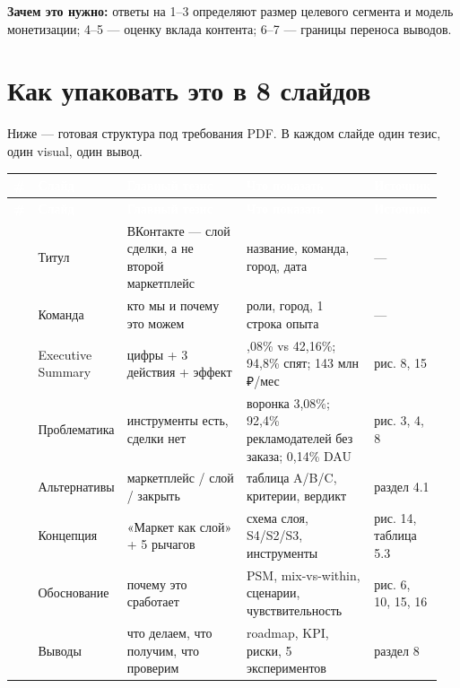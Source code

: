 \documentclass[10pt,a4paper]{article}
\begin{document}
\textbf{Зачем это нужно:} ответы на 1–3 определяют размер целевого сегмента и модель монетизации; 4–5 — оценку вклада контента; 6–7 — границы переноса выводов.\par

\clearpage

\section{Как упаковать это в 8 слайдов}

Ниже — готовая структура под требования PDF. В каждом слайде один тезис, один visual, один вывод.\par

\begingroup
\footnotesize
\setlength{\tabcolsep}{3pt}
\renewcommand{\arraystretch}{1.12}
\begin{longtable}{@{}>{\raggedright\arraybackslash}p{0.0286\linewidth}>{\raggedright\arraybackslash}p{0.1215\linewidth}>{\raggedright\arraybackslash}p{0.3288\linewidth}>{\raggedright\arraybackslash}p{0.3288\linewidth}>{\raggedright\arraybackslash}p{0.1430\linewidth}@{}}
\rowcolor{blue}
\textcolor{white}{\textbf{\#}} & \textcolor{white}{\textbf{Слайд}} & \textcolor{white}{\textbf{Главный тезис}} & \textcolor{white}{\textbf{Что показать}} & \textcolor{white}{\textbf{Источник}} \\
\endfirsthead
\rowcolor{blue}
\textcolor{white}{\textbf{\#}} & \textcolor{white}{\textbf{Слайд}} & \textcolor{white}{\textbf{Главный тезис}} & \textcolor{white}{\textbf{Что показать}} & \textcolor{white}{\textbf{Источник}} \\
\endhead
\hline
1 & Титул & ВКонтакте — слой сделки, а не второй маркетплейс & название, команда, город, дата & — \\
2 & Команда & кто мы и почему это можем & роли, город, 1 строка опыта & — \\
3 & Executive Summary & 3 цифры + 3 действия + эффект & 3,08\% vs 42,16\%; 94,8\% спят; 143 млн ₽/мес & рис. 8, 15 \\
4 & Проблематика & инструменты есть, сделки нет & воронка 3,08\%; 92,4\% рекламодателей без заказа; 0,14\% DAU & рис. 3, 4, 8 \\
5 & Альтернативы & маркетплейс / слой / закрыть & таблица A/B/C, критерии, вердикт & раздел 4.1 \\
6 & Концепция & «Маркет как слой» + 5 рычагов & схема слоя, S4/S2/S3, инструменты & рис. 14, таблица 5.3 \\
7 & Обоснование & почему это сработает & PSM, mix-vs-within, сценарии, чувствительность & рис. 6, 10, 15, 16 \\
8 & Выводы & что делаем, что получим, что проверим & roadmap, KPI, риски, 5 экспериментов & раздел 8 \\
\hline
\end{longtable}
\endgroup
\vspace{4pt}
\end{document}

